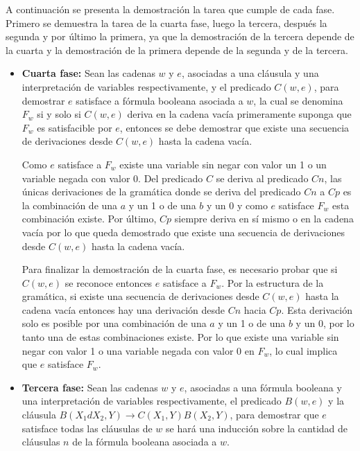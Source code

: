 A continuación se presenta la demostración la tarea que cumple de cada fase. Primero se demuestra la tarea de la cuarta fase, luego la tercera, después la segunda y por último la primera, ya que la demostración de la tercera depende de la cuarta y la demostración de la primera depende de la segunda y de la tercera.

\begin{itemize}
    \item \textbf{Cuarta fase:} Sean las cadenas $w$ y $e$, asociadas a una cláusula y una interpretación de variables respectivamente, y el predicado $C(w,e)$, para demostrar $e$
          satisface a fórmula booleana asociada a $w$, la cual se denomina $F_w$ si y solo si $C(w,e)$ deriva
          en la cadena vacía primeramente suponga que $F_w$ es satisfacible por $e$, entonces se debe demostrar que
          existe una secuencia de derivaciones desde $C(w,e)$ hasta la cadena vacía.

          Como $e$ satisface a $F_w$ existe una variable sin negar con valor un 1 o un variable negada con valor 0.
          Del predicado $C$ se deriva al predicado $Cn$, las únicas derivaciones de la gramática donde se deriva del
          predicado $Cn$ a $Cp$ es la combinación de una $a$ y un 1 o de una $b$ y un 0 y como $e$ satisface $F_w$ esta combinación existe.
          Por último, $Cp$ siempre deriva en sí mismo o en la cadena vacía por lo que queda demostrado que existe una secuencia de derivaciones desde $C(w,e)$ hasta la cadena vacía.

          Para finalizar la demostración de la cuarta fase, es necesario probar que si $C(w,e)$ se reconoce entonces $e$ satisface a $F_w$. Por la estructura de la gramática,
          si existe una secuencia de derivaciones desde $C(w,e)$ hasta la cadena vacía entonces hay una derivación
          desde $Cn$ hacia $Cp$. Esta derivación solo es posible por una combinación de una $a$ y un 1 o de una $b$ y
          un 0, por lo tanto una de estas combinaciones existe. Por lo que existe una variable sin negar con valor 1 o
          una variable negada con valor 0 en $F_w$, lo cual implica que $e$ satisface $F_w$.

    \item \textbf{Tercera fase:} Sean las cadenas $w$ y $e$, asociadas a una fórmula booleana y una interpretación de variables respectivamente, el predicado $B(w,e)$ y la cláusula $B(X_1dX_2,Y)\to C(X_1,Y) B(X_2,Y)$,
          para demostrar que $e$ satisface todas las cláusulas de $w$ se hará una inducción sobre la cantidad de cláusulas $n$ de la fórmula booleana asociada a $w$.


\end{itemize}
